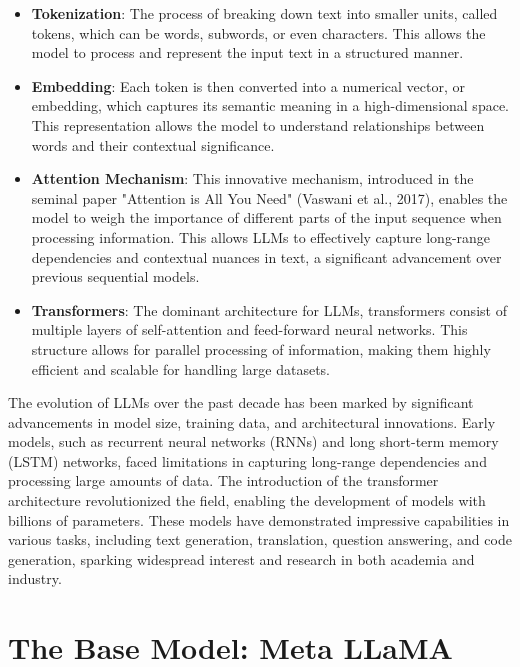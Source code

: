\documentclass{article}
\begin{document}
		\begin{itemize}
			\item \textbf{Tokenization}: The process of breaking down text into smaller units, called tokens, which can be words, subwords, or even characters. This allows the model to process and represent the input text in a structured manner. 
			
			\item \textbf{Embedding}: Each token is then converted into a numerical vector, or embedding, which captures its semantic meaning in a high-dimensional space. This representation allows the model to understand relationships between words and their contextual significance.
			
			\item \textbf{Attention Mechanism}: This innovative mechanism, introduced in the seminal paper "Attention is All You Need" (Vaswani et al., 2017), enables the model to weigh the importance of different parts of the input sequence when processing information. This allows LLMs to effectively capture long-range dependencies and contextual nuances in text, a significant advancement over previous sequential models.
			
			\item \textbf{Transformers}: The dominant architecture for LLMs, transformers consist of multiple layers of self-attention and feed-forward neural networks. This structure allows for parallel processing of information, making them highly efficient and scalable for handling large datasets.
		\end{itemize}	
		
		The evolution of LLMs over the past decade has been marked by significant advancements in model size, training data, and architectural innovations. 
		Early models, such as recurrent neural networks (RNNs) and long short-term memory (LSTM) networks, faced limitations in capturing long-range dependencies and processing large amounts of data. 
		The introduction of the transformer architecture revolutionized the field, enabling the development of models with billions of parameters.
		These models have demonstrated impressive capabilities in various tasks, including text generation, translation, question answering, and code generation, sparking widespread interest and research in both academia and industry.
		
	\section{The Base Model: Meta LLaMA}
		
\end{document}
